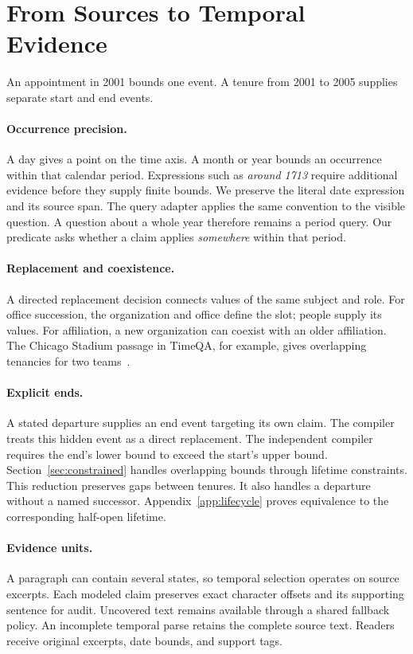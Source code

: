 \section{From Sources to Temporal Evidence}
\label{sec:sources}

An appointment in 2001 bounds one event.
A tenure from 2001 to 2005 supplies separate start and end events.


\paragraph{Occurrence precision.}
A day gives a point on the time axis.
A month or year bounds an occurrence within that calendar period.
Expressions such as \emph{around 1713} require additional evidence before they supply finite bounds.
We preserve the literal date expression and its source span.
The query adapter applies the same convention to the visible question.
A question about a whole year therefore remains a period query.
Our predicate asks whether a claim applies \emph{somewhere} within that period.

\paragraph{Replacement and coexistence.}
A directed replacement decision connects values of the same subject and role.
For office succession, the organization and office define the slot; people supply its values.
For affiliation, a new organization can coexist with an older affiliation.
The Chicago Stadium passage in TimeQA, for example, gives overlapping tenancies for two teams~\citep{chen2021timeqa}.

\paragraph{Explicit ends.}
A stated departure supplies an end event targeting its own claim.
The compiler treats this hidden event as a direct replacement.
The independent compiler requires the end's lower bound to exceed the start's upper bound.
Section~\ref{sec:constrained} handles overlapping bounds through lifetime constraints.
This reduction preserves gaps between tenures.
It also handles a departure without a named successor.
Appendix~\ref{app:lifecycle} proves equivalence to the corresponding half-open lifetime.

\paragraph{Evidence units.}
A paragraph can contain several states, so temporal selection operates on source excerpts.
Each modeled claim preserves exact character offsets and its supporting sentence for audit.
Uncovered text remains available through a shared fallback policy.
An incomplete temporal parse retains the complete source text.
Readers receive original excerpts, date bounds, and support tags.


